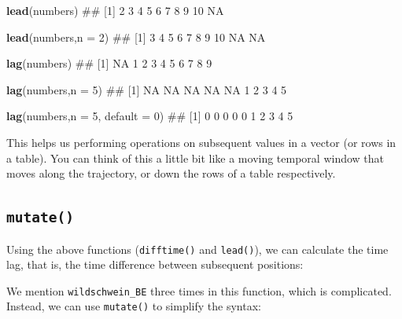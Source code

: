 \documentclass[]{book}
\newenvironment{Shaded}{\begin{snugshade}}{\end{snugshade}}
\newcommand{\KeywordTok}[1]{\textcolor[rgb]{0.13,0.29,0.53}{\textbf{#1}}}
\newcommand{\DataTypeTok}[1]{\textcolor[rgb]{0.13,0.29,0.53}{#1}}
\newcommand{\DecValTok}[1]{\textcolor[rgb]{0.00,0.00,0.81}{#1}}
\newcommand{\StringTok}[1]{\textcolor[rgb]{0.31,0.60,0.02}{#1}}
\newcommand{\OperatorTok}[1]{\textcolor[rgb]{0.81,0.36,0.00}{\textbf{#1}}}
\newcommand{\NormalTok}[1]{#1}
\begin{document}
\begin{Shaded}
\begin{Highlighting}[]
\KeywordTok{lead}\NormalTok{(numbers)}
\NormalTok{##  [1]  2  3  4  5  6  7  8  9 10 NA}

\KeywordTok{lead}\NormalTok{(numbers,}\DataTypeTok{n =} \DecValTok{2}\NormalTok{)}
\NormalTok{##  [1]  3  4  5  6  7  8  9 10 NA NA}

\KeywordTok{lag}\NormalTok{(numbers)}
\NormalTok{##  [1] NA  1  2  3  4  5  6  7  8  9}

\KeywordTok{lag}\NormalTok{(numbers,}\DataTypeTok{n =} \DecValTok{5}\NormalTok{)}
\NormalTok{##  [1] NA NA NA NA NA  1  2  3  4  5}

\KeywordTok{lag}\NormalTok{(numbers,}\DataTypeTok{n =} \DecValTok{5}\NormalTok{, }\DataTypeTok{default =} \DecValTok{0}\NormalTok{)}
\NormalTok{##  [1] 0 0 0 0 0 1 2 3 4 5}
\end{Highlighting}
\end{Shaded}

This helps us performing operations on subsequent values in a vector (or
rows in a table). You can think of this a little bit like a moving
temporal window that moves along the trajectory, or down the rows of a
table respectively.

\subsection{\texorpdfstring{\texttt{mutate()}}{mutate()}}\label{mutate}

Using the above functions (\texttt{difftime()} and \texttt{lead()}), we
can calculate the time lag, that is, the time difference between
subsequent positions:

\begin{Shaded}
\end{Shaded}

We mention \texttt{wildschwein\_BE} three times in this function, which
is complicated. Instead, we can use \texttt{mutate()} to simplify the
syntax:
\end{document}
